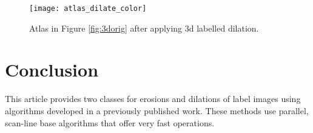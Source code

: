 \documentclass{InsightArticle}
\begin{document}
\begin{figure}[htbp]
\centering
\texttt{[image: atlas\_dilate\_color]}
\caption{Atlas in Figure \ref{fig:3dorig} after applying 3d labelled dilation. \label{fig:3ddil}}
\end{figure}



\section{Conclusion}
This article provides two classes for erosions and dilations of label
images using algorithms developed in a previously published
work. These methods use parallel, scan-line base algorithms that offer
very fast operations.


\nocite{ITKSoftwareGuide}
\end{document}
